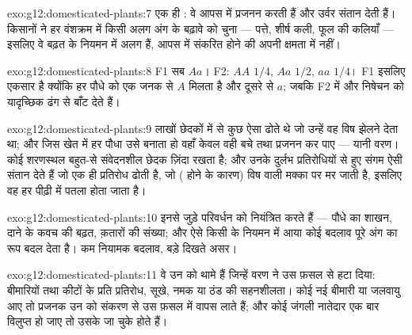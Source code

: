 \begin{solution}{exo:g12:domesticated-plants:7}
एक ही : वे आपस में प्रजनन करती हैं और उर्वर संतान देती हैं। किसानों ने
हर वंशक्रम में किसी अलग अंग के बढ़ावे को चुना --- पत्ते, शीर्ष कली, फूल की
कलियाँ --- इसलिए वे बढ़त के नियमन में अलग हैं, आपस में संकरित होने की अपनी
क्षमता में नहीं।
\end{solution}

\begin{solution}{exo:g12:domesticated-plants:8}
F1 सब $Aa$। F2: $AA$ $1/4$, $Aa$ $1/2$, $aa$ $1/4$। F1 इसलिए एकसार है
क्योंकि हर पौधे को एक जनक से $A$ मिलता है और दूसरे से $a$; जबकि F2 में
 और निषेचन  को यादृच्छिक ढंग से बाँट देते
हैं।
\end{solution}

\begin{solution}{exo:g12:domesticated-plants:9}
लाखों छेदकों में से कुछ ऐसा  ढोते थे जो उन्हें वह विष झेलने देता
था; और जिस खेत में हर पौधा उसे बनाता हो वहाँ केवल वही बचे तथा प्रजनन कर पाए
--- यानी वरण। कोई शरणस्थल बहुत-से संवेदनशील छेदक ज़िंदा रखता है; और उनके
दुर्लभ प्रतिरोधियों से हुए संगम ऐसी संतान देते हैं जो एक ही प्रतिरोध
 ढोती है, जो ( होने के कारण) विष वाली मक्का पर मर जाती
है, इसलिए वह  हर पीढ़ी में पतला होता जाता है।
\end{solution}

\begin{solution}{exo:g12:domesticated-plants:10}
इनसे जुड़े  परिवर्धन को नियंत्रित करते हैं --- पौधे का शाखन, दाने के कवच
की बढ़त, क़तारों की संख्या; और ऐसे किसी  के नियमन में आया कोई बदलाव पूरे
अंग का रूप बदल देता है। कम नियामक बदलाव, बड़े दिखते असर।
\end{solution}

\begin{solution}{exo:g12:domesticated-plants:11}
वे उन  को थामे हैं जिन्हें वरण ने उस फ़सल से हटा दिया:
बीमारियों तथा कीटों के प्रति प्रतिरोध, सूखे, नमक या ठंड की सहनशीलता। कोई नई
बीमारी या जलवायु आए तो प्रजनक उन  को संकरण से उस फ़सल में
वापस लाते हैं; और कोई जंगली नातेदार एक बार विलुप्त हो जाए तो उसके
 जा चुके होते हैं।
\end{solution}

